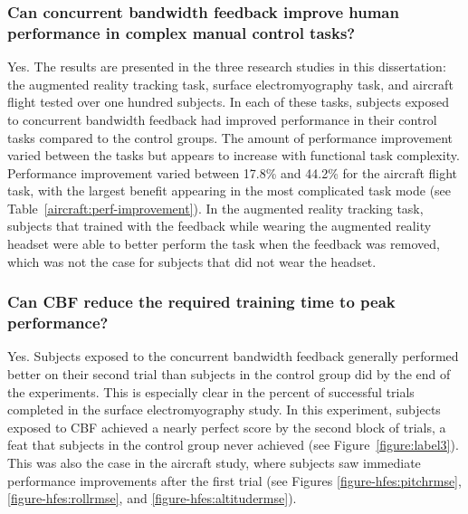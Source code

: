 \subsubsection{Can concurrent bandwidth feedback improve human performance in complex manual control tasks?}
Yes.
The results are presented in the three research studies in this dissertation: the augmented reality tracking task, surface electromyography task, and aircraft flight tested over one hundred subjects.
In each of these tasks, subjects exposed to concurrent bandwidth feedback had improved performance in their control tasks compared to the control groups.
The amount of performance improvement varied between the tasks but appears to increase with functional task complexity.
Performance improvement varied between 17.8\% and 44.2\% for the aircraft flight task, with the largest benefit appearing in the most complicated task mode (see Table~\ref{aircraft:perf-improvement}).
In the augmented reality tracking task, subjects that trained with the feedback while wearing the augmented reality headset were able to better perform the task when the feedback was removed, which was not the case for subjects that did not wear the headset.

\subsubsection{Can CBF reduce the required training time to peak performance?}
Yes.
Subjects exposed to the concurrent bandwidth feedback generally performed better on their second trial than subjects in the control group did by the end of the experiments.
This is especially clear in the percent of successful trials completed in the surface electromyography study.
In this experiment, subjects exposed to CBF achieved a nearly perfect score by the second block of trials, a feat that subjects in the control group never achieved (see Figure~\ref{figure:label3}).
This was also the case in the aircraft study, where subjects saw immediate performance improvements after the first trial (see Figures \ref{figure-hfes:pitchrmse}, \ref{figure-hfes:rollrmse}, and \ref{figure-hfes:altitudermse}).

